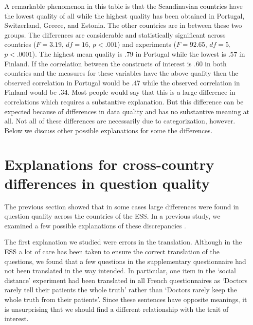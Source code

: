 \documentclass[a4paper,12pt]{article}
\begin{document}
A remarkable phenomenon in this table is that the Scandinavian countries have the lowest quality of all while the highest quality has been obtained in Portugal, Switzerland, Greece, and Estonia. The other countries are in between these two groups. 
The differences are considerable and statistically significant across countries ($F=3.19$, $df=16$, $p<.001$) and experiments ($F=92.65$, $df=5$, $p<.0001$). The highest mean quality is .79 in Portugal while the lowest is .57 in Finland. If the correlation between the constructs of interest is .60 in both countries and the measures for these variables have the above quality then the observed correlation in Portugal would be .47 while the observed correlation in Finland would be .34. Most people would say that this is a large difference in correlations which requires a substantive explanation. But this difference can be expected because of differences in data quality and has no substantive meaning at all. Not all of these differences are necessarily due to categorization, however. Below we discuss other possible explanations for some the differences.

\section{Explanations for cross-country differences in question quality}

The previous section showed that in some cases large differences were found in question quality across the countries of the ESS. In a previous study, we examined a few possible explanations of these discrepancies \citep{oberski_differences_}.

The first explanation we studied were errors in the translation. Although in the ESS a lot of care has been taken to ensure the correct translation of the questions, we found that a few questions in the supplementary questionnaire had not been translated in the way intended. In particular, one item in the `social distance' experiment had been translated in all French questionnaires as `Doctors rarely tell their patients the whole truth' rather than `Doctors rarely keep the whole truth from their patients'. Since these sentences have opposite meanings, it is unsurprising that we should find a different relationship with the trait of interest.
\end{document}

